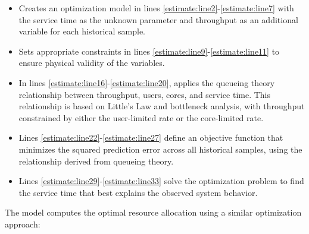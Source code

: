 \begin{itemize}
    \item Creates an optimization model in lines \ref{estimate:line2}-\ref{estimate:line7} with the service time as the unknown parameter and throughput as an additional variable for each historical sample.
    \item Sets appropriate constraints in lines \ref{estimate:line9}-\ref{estimate:line11} to ensure physical validity of the variables.
    \item In lines \ref{estimate:line16}-\ref{estimate:line20}, applies the queueing theory relationship between throughput, users, cores, and service time. This relationship is based on Little's Law and bottleneck analysis, with throughput constrained by either the user-limited rate or the core-limited rate.
    \item Lines \ref{estimate:line22}-\ref{estimate:line27} define an objective function that minimizes the squared prediction error across all historical samples, using the relationship derived from queueing theory.
    \item Lines \ref{estimate:line29}-\ref{estimate:line33} solve the optimization problem to find the service time that best explains the observed system behavior.
\end{itemize}

The model computes the optimal resource allocation using a similar optimization approach:

